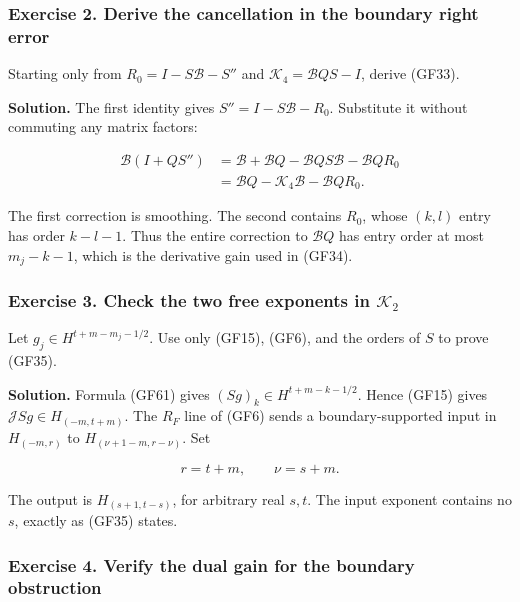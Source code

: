 \documentclass[
  11pt,
]{article}
\begin{document}
\subsubsection{Exercise 2. Derive the cancellation in the boundary right
error}\label{exercise-2.-derive-the-cancellation-in-the-boundary-right-error}

Starting only from \(R_0=I-S\mathcal B-S''\) and
\(\mathscr K_4=\mathcal BQS-I\), derive (GF33).

\textbf{Solution.} The first identity gives \(S''=I-S\mathcal B-R_0\).
Substitute it without commuting any matrix factors:

\[
 \begin{aligned}
 \mathcal B(I+QS'')
 &=\mathcal B+\mathcal BQ-\mathcal BQS\mathcal B-\mathcal BQR_0\\
 &=\mathcal BQ-\mathscr K_4\mathcal B-\mathcal BQR_0.
 \end{aligned}
 \tag{GF62}
\]

The first correction is smoothing. The second contains \(R_0\), whose
\((k,l)\) entry has order \(k-l-1\). Thus the entire correction to
\(\mathcal BQ\) has entry order at most \(m_j-k-1\), which is the
derivative gain used in (GF34).

\subsubsection{\texorpdfstring{Exercise 3. Check the two free exponents
in
\(\mathscr K_2\)}{Exercise 3. Check the two free exponents in \textbackslash mathscr K\_2}}\label{exercise-3.-check-the-two-free-exponents-in-mathscr-k_2}

Let \(g_j\in H^{t+m-m_j-1/2}\). Use only (GF15), (GF6), and the orders
of \(S\) to prove (GF35).

\textbf{Solution.} Formula (GF61) gives \((Sg)_k\in H^{t+m-k-1/2}\).
Hence (GF15) gives \(\mathcal JSg\in H_{(-m,t+m)}\). The \(R_F\) line of
(GF6) sends a boundary-supported input in \(H_{(-m,r)}\) to
\(H_{(\nu+1-m,r-\nu)}\). Set

\[
 r=t+m,
 \qquad \nu=s+m.
 \tag{GF63}
\]

The output is \(H_{(s+1,t-s)}\), for arbitrary real \(s,t\). The input
exponent contains no \(s\), exactly as (GF35) states.

\subsubsection{Exercise 4. Verify the dual gain for the boundary
obstruction}\label{exercise-4.-verify-the-dual-gain-for-the-boundary-obstruction}
\end{document}
